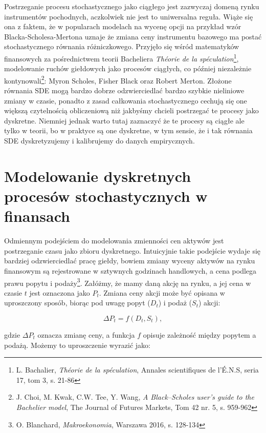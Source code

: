 Postrzeganie procesu stochastycznego jako ciągłego jest zazwyczaj domeną rynku instrumentów pochodnych, aczkolwiek nie jest to uniwersalna reguła. Wiąże się ona z faktem, że w popularach modelach na wycenę opcji na przykład wzór Blacka-Scholesa-Mertona uznaje że zmiana ceny instrumentu bazowego ma postać stochastycznego równania różniczkowego. Przyjęło się wśród matematyków finansowych za pośrednictwem teorii Bacheliera \textit{Théorie de la spéculation}\footnote{L. Bachalier, \textit{Théorie de la spéculation}, Annales scientifiques de l’É.N.S, seria 17, tom 3, s. 21-86}, modelowanie ruchów giełdowych jako procesów ciągłych, co później niezależnie kontynowali\footnote{J. Choi, M. Kwak, C.W. Tee, Y. Wang, \textit{A Black–Scholes user’s guide to the Bachelier model}, The Journal of Futures Markets, Tom 42 nr. 5, s. 959-962}: Myron Scholes, Fisher Black oraz Robert Merton. Złożone równania SDE mogą bardzo dobrze odzwierciedlać bardzo szybkie nieliniowe zmiany w czasie, ponadto z zasad całkowania stochastycznego cechują się one większą czytelnością obliczeniową niż jakbyśmy chcieli postrzegać te procesy jako dyskretne. Niemniej jednak warto tutaj zaznaczyć że te procesy są ciągłe ale tylko w teorii, bo w praktyce są one dyskretne, w tym sensie, że i tak równania SDE dyskretyzujemy i kalibrujemy do danych empirycznych.


\section{Modelowanie dyskretnych procesów stochastycznych w finansach}
Odmiennym podejściem do modelowania zmienności cen aktywów jest postrzeganie czasu jako zbioru dyskretnego. Intuicyjnie takie podejście wydaje się bardziej odzwierciedlać pracę giełdy, bowiem zmiany wyceny aktywów na rynku finansowym są rejestrowane w sztywnych godzinach handlowych, a cena podlega prawu popytu i podaży\footnote{O. Blanchard, \textit{Makroekonomia}, Warszawa 2016, s. 128-134}. Załóżmy, że mamy daną akcję na rynku, a jej cena w czasie \( t \) jest oznaczona jako \( P_t \). Zmiana ceny akcji może być opisana w uproszczony sposób, biorąc pod uwagę popyt (\( D_t \)) i podaż (\( S_t \)) akcji:

\begin{equation}
\Delta P_t = f(D_t, S_t),
\end{equation}

gdzie \( \Delta P_t \) oznacza zmianę ceny, a funkcja \( f \) opisuje zależność między popytem a podażą. Możemy to uproszczenie wyrazić jako:

